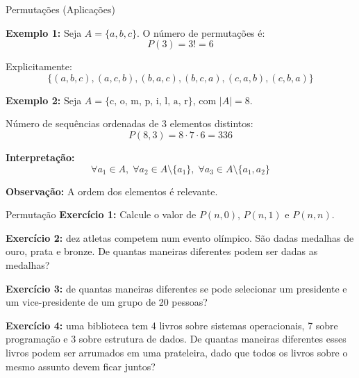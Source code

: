 \documentclass[9pt]{beamer}
\begin{document}
\begin{frame}{Permutações (Aplicações)}

\textbf{Exemplo 1:} Seja $A = \{a,b,c\}$. O número de permutações é:
\[
P(3) = 3! = 6
\]

\vspace{0.3cm}

Explicitamente:
\[
\{(a,b,c), (a,c,b), (b,a,c), (b,c,a), (c,a,b), (c,b,a)\}
\]

\vspace{0.5cm}

\textbf{Exemplo 2:} Seja $A = \{\text{c, o, m, p, i, l, a, r}\}$, com $|A| = 8$.

\vspace{0.3cm}

Número de sequências ordenadas de 3 elementos distintos:
\[
P(8,3) = 8 \cdot 7 \cdot 6 = 336
\]

\vspace{0.4cm}

\textbf{Interpretação:}
\[
\forall a_1 \in A,\;
\forall a_2 \in A \setminus \{a_1\},\;
\forall a_3 \in A \setminus \{a_1,a_2\}
\]

\vspace{0.2cm}

\textbf{Observação:} A ordem dos elementos é relevante.

\end{frame}


\begin{frame}{Permutação}
\textbf{Exercício 1:} Calcule o valor de $P(n,0)$, $P(n,1)$ e $P(n,n)$.

\vspace{0.2cm}

\textbf{Exercício 2:} dez atletas competem num evento olímpico. São dadas medalhas de ouro, prata e bronze. De quantas maneiras diferentes podem ser dadas as medalhas?

\vspace{0.2cm}

\textbf{Exercício 3:} de quantas maneiras diferentes se pode selecionar um presidente e um vice-presidente de um grupo de 20 pessoas?

\vspace{0.2cm}

\textbf{Exercício 4:} uma biblioteca tem 4 livros sobre sistemas operacionais, 7 sobre programação e 3 sobre estrutura de dados. De quantas maneiras diferentes esses livros podem ser arrumados em uma prateleira, dado que todos os livros sobre o mesmo assunto devem ficar juntos?
\end{frame}
\end{document}
